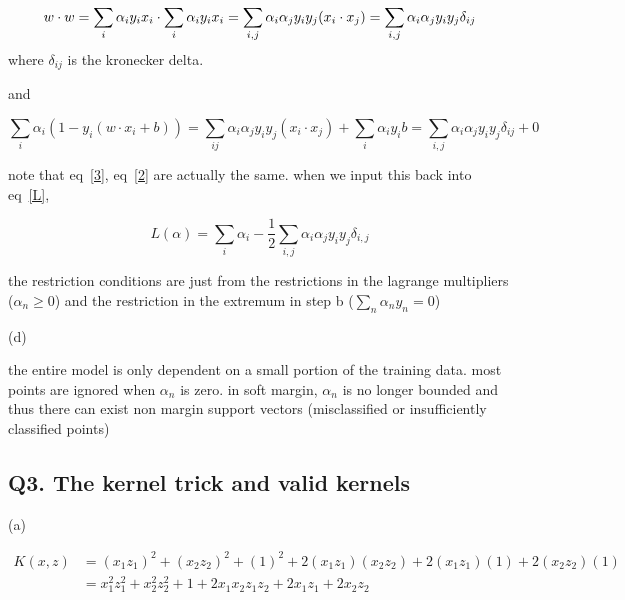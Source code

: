 \documentclass{report}
\begin{document}
\begin{equation}\label{3}
    w\cdot w = \sum_i \alpha_iy_ix_i \cdot \sum_i \alpha_iy_ix_i\\ = \sum_{i,j} \alpha_i\alpha_j y_iy_j(x_i\cdot x_j) = \sum_{i,j}\alpha_i\alpha_jy_iy_j\delta_{ij}
\end{equation}
where \(\delta_{ij}\) is the kronecker delta.

and

\begin{equation}\label{2}
    \sum_i \alpha_i(1-y_i(w\cdot x_i+b)) = \sum_{ij} \alpha_i \alpha_j y_iy_j (x_i\cdot x_j) + \sum_i \alpha_i y_i b = \sum_{i,j} \alpha_i\alpha_jy_iy_j \delta_{ij} + 0
\end{equation}

note that eq~\ref{3}, eq~\ref{2} are actually the same. when we input this back into eq~\ref{L},

\begin{equation}
    L(\alpha) = \sum_i \alpha_i - \frac{1}{2}\sum_{i,j} \alpha_i \alpha_j y_iy_j \delta_{i,j}
\end{equation}

the restriction conditions are just from the restrictions in the lagrange multipliers (\(\alpha_n\geq 0\)) and the restriction in the extremum in step b (\(\sum_n \alpha_ny_n = 0\))



(d)

the entire model is only dependent on a small portion of the training data. most points are ignored when \(\alpha_n\) is zero. in soft margin, \(\alpha_n\) is no longer bounded and thus there can exist non margin support vectors (misclassified or insufficiently classified points)



\newpage

\subsection*{Q3. The kernel trick and valid kernels}
(a)

\begin{equation}
    \begin{split}
        K(x, z) &= (x_1 z_1)^2 + (x_2 z_2)^2 + (1)^2 + 2(x_1 z_1)(x_2 z_2) + 2(x_1 z_1)(1) + 2(x_2 z_2)(1)\\
        &= x_1^2 z_1^2 + x_2^2 z_2^2 + 1 + 2 x_1 x_2 z_1 z_2 + 2 x_1 z_1 + 2 x_2 z_2
    \end{split}
\end{equation}
\end{document}
